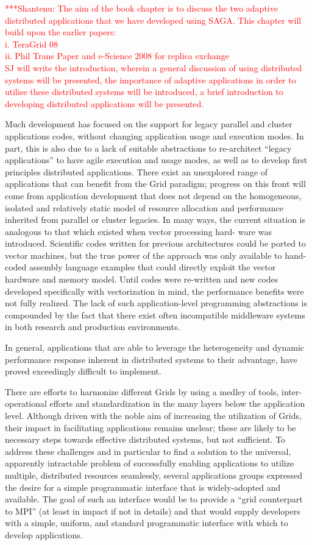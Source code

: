 \documentclass[10pt,letterpaper]{article}
\newcommand{\jhanote}[1]{  {\textcolor{red}     { ***Shantenu: #1 }}}
\newcommand{\jhanote}[1]{}
\begin{document}
\jhanote{The aim of the book chapter is to discuss the two adaptive
  distributed applications that we have developed using SAGA. This
  chapter will build upon the earlier papers:\\
  i. TeraGrid 08 \\
  ii. Phil Trans Paper and e-Science 2008 for replica exchange\\
  SJ will write the introduction, wherein a general discussion of
  using distributed systems will be presented, the importance of
  adaptive applications in order to utilise these distributed systems
  will be introduced, a brief introduction to developing distributed
  applications will be presented.}

Much development has focused on the support for legacy parallel and
cluster applications codes, without changing application usage and
execution modes. In part, this is also due to a lack of suitable
abstractions to re-architect ``legacy applications'' to have agile
execution and usage modes, as well as to develop ﬁrst principles
distributed applications. There exist an unexplored range of
applications that can beneﬁt from the Grid paradigm; progress on this
front will come from application development that does not depend on
the homogeneous, isolated and relatively static model of resource
allocation and performance inherited from parallel or cluster
legacies. In many ways, the current situation is analogous to that
which existed when vector processing hard- ware was
introduced. Scientiﬁc codes written for previous architectures could
be ported to vector machines, but the true power of the approach was
only available to hand-coded assembly language examples that could
directly exploit the vector hardware and memory model. Until codes
were re-written and new codes developed speciﬁcally with vectorization
in mind, the performance beneﬁts were not fully realized.  The lack of
such application-level programming abstractions is compounded by the
fact that there exist often incompatible middleware systems in both
research and production environments.

In general, applications that are able to leverage the heterogeneity
and dynamic performance response inherent in distributed systems to
their advantage, have proved exceedingly diﬃcult to implement.

There are eﬀorts to harmonize diﬀerent Grids by using a medley of
tools, inter-operational eﬀorts and standardization in the many layers
below the application level. Although driven with the noble aim of
increasing the utilization of Grids, their impact in facilitating
applications remains unclear; these are likely to be necessary steps
towards eﬀective distributed systems, but not suﬃcient.  To address
these challenges and in particular to ﬁnd a solution to the universal,
apparently intractable problem of successfully enabling applications
to utilize multiple, distributed resources seamlessly, several
applications groups expressed the desire for a simple programmatic
interface that is widely-adopted and available. The goal of such an
interface would be to provide a ``grid counterpart to MPI'' (at least
in impact if not in details) and that would supply developers with a
simple, uniform, and standard programmatic interface with which to
develop applications.
\end{document}
